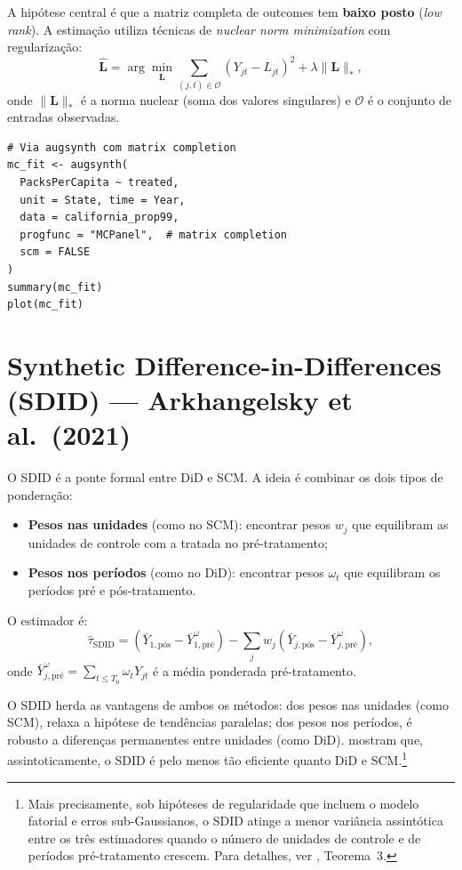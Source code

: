 \documentclass[12pt, a4paper, openany]{book}
\begin{document}
A hipótese central é que a matriz completa de outcomes tem \textbf{baixo posto} (\textit{low rank}). A estimação utiliza técnicas de \textit{nuclear norm minimization} com regularização:
\begin{equation}
  \hat{\mathbf{L}} = \arg\min_{\mathbf{L}} \sum_{(j,t) \in \mathcal{O}} (Y_{jt} - L_{jt})^2 + \lambda \|\mathbf{L}\|_* ,
\end{equation}
onde $\|\mathbf{L}\|_*$ é a norma nuclear (soma dos valores singulares) e $\mathcal{O}$ é o conjunto de entradas observadas.

\begin{lstlisting}[style=Rstyle]
# Via augsynth com matrix completion
mc_fit <- augsynth(
  PacksPerCapita ~ treated,
  unit = State, time = Year,
  data = california_prop99,
  progfunc = "MCPanel",  # matrix completion
  scm = FALSE
)
summary(mc_fit)
plot(mc_fit)
\end{lstlisting}


\section{Synthetic Difference-in-Differences (SDID) --- Arkhangelsky et al.\ (2021)}

O SDID \citep{ArkhangelskyEtAl2021} é a ponte formal entre DiD e SCM. A ideia é combinar os dois tipos de ponderação:
\begin{itemize}[leftmargin=1.5cm]
  \item \textbf{Pesos nas unidades} (como no SCM): encontrar pesos $w_j$ que equilibram as unidades de controle com a tratada no pré-tratamento;
  \item \textbf{Pesos nos períodos} (como no DiD): encontrar pesos $\omega_t$ que equilibram os períodos pré e pós-tratamento.
\end{itemize}

O estimador é:
\begin{equation}
  \hat{\tau}_{\text{SDID}} = \left(\bar{Y}_{1,\text{pós}} - \bar{Y}_{1,\text{pré}}^{\omega}\right) - \sum_{j} w_j \left(\bar{Y}_{j,\text{pós}} - \bar{Y}_{j,\text{pré}}^{\omega}\right),
  \label{eq:sdid}
\end{equation}
onde $\bar{Y}_{j,\text{pré}}^{\omega} = \sum_{t \leq T_0} \omega_t Y_{jt}$ é a média ponderada pré-tratamento.

\begin{notabox}
O SDID herda as vantagens de ambos os métodos: dos pesos nas unidades (como SCM), relaxa a hipótese de tendências paralelas; dos pesos nos períodos, é robusto a diferenças permanentes entre unidades (como DiD). \cite{ArkhangelskyEtAl2021} mostram que, assintoticamente, o SDID é pelo menos tão eficiente quanto DiD e SCM.\footnote{Mais precisamente, sob hipóteses de regularidade que incluem o modelo fatorial e erros sub-Gaussianos, o SDID atinge a menor variância assintótica entre os três estimadores quando o número de unidades de controle e de períodos pré-tratamento crescem. Para detalhes, ver \cite{ArkhangelskyEtAl2021}, Teorema~3.}
\end{notabox}
\end{document}
